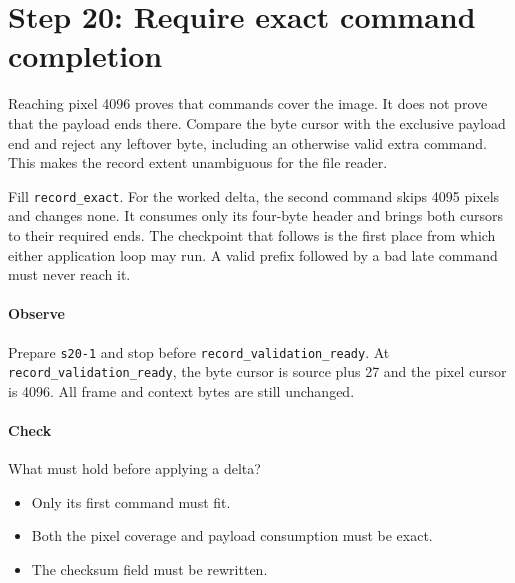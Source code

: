 \section{Step 20: Require exact command completion}
Reaching pixel 4096 proves that commands cover the image. It does not prove
that the payload ends there. Compare the byte cursor with the exclusive payload
end and reject any leftover byte, including an otherwise valid extra command.
This makes the record extent unambiguous for the file reader.

Fill \texttt{record\_exact}. For the worked delta, the second command skips
4095 pixels and changes none. It consumes only its four-byte header and brings
both cursors to their required ends. The checkpoint that follows is the first
place from which either application loop may run. A valid prefix followed by a
bad late command must never reach it.

\paragraph{Observe} Prepare \texttt{s20-1} and stop before
\texttt{record\_validation\_ready}. At \texttt{record\_validation\_ready}, the byte cursor is
source plus 27 and the pixel cursor is 4096. All frame and context bytes are
still unchanged.

\paragraph{Check} What must hold before applying a delta?
\begin{itemize}
  \item[A.] Only its first command must fit.
  \item[B.] Both the pixel coverage and payload consumption must be exact.
  \item[C.] The checksum field must be rewritten.
\end{itemize}
